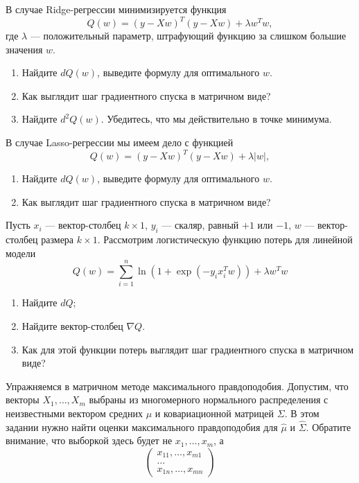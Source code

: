 \begin{problem}{}
	В случае Ridge-регрессии минимизируется функция
	\[
	Q(w) = (y - Xw)^T(y - Xw) + \lambda w^T w,
	\]
	где $\lambda$ — положительный параметр, штрафующий функцию за слишком большие значения $w$.
	
	\begin{enumerate}
		\item Найдите $dQ(w)$, выведите формулу для оптимального $w$.
		\item Как выглядит шаг градиентного спуска в матричном виде?
		\item Найдите $d^2Q(w)$. Убедитесь, что мы действительно в точке минимума. 
	\end{enumerate}
	
	В случае Lasso-регрессии мы имеем дело с функцией
	\[
	Q(w) = (y - Xw)^T(y - Xw) + \lambda |w|,
	\]
	
	\begin{enumerate}
		\item Найдите $dQ(w)$, выведите формулу для оптимального $w$.
		\item Как выглядит шаг градиентного спуска в матричном виде?
	\end{enumerate}
\end{problem}

\begin{problem}{}
	Пусть $x_i$ — вектор-столбец $k\times 1$, $y_i$ — скаляр, равный $+1$ или $-1$, $w$ — вектор-столбец размера $k\times 1$. Рассмотрим логистическую функцию потерь для линейной модели
	\[
	Q(w) = \sum_{i=1}^n \ln (1 + \exp(-y_ix_i^Tw)) + \lambda w^T w
	\]
	
	\begin{enumerate}
		\item Найдите $dQ$;
		\item Найдите вектор-столбец $\nabla Q$.
		\item Как для этой функции потерь выглядит шаг градиентного спуска в матричном виде? 
	\end{enumerate}
\end{problem}


\begin{problem}{}
	Упражняемся в матричном методе максимального правдоподобия.  Допустим, что векторы $X_1, \ldots, X_m$ выбраны из многомерного нормального распределения с неизвестными вектором средних $\mu$ и ковариационной матрицей $\Sigma$. В этом задании нужно найти оценки максимального правдоподобия для $\hat \mu$ и $\hat \Sigma$.  Обратите внимание, что выборкой здесь будет не $x_1, \ldots, x_m$, а 
	\begin{equation*}
	\begin{pmatrix}
	x_{11}, \ldots, x_{m1} \\
	\ldots  \\ 
	x_{1n}, \ldots, x_{mn}
	\end{pmatrix}
	\end{equation*}
\end{problem}


